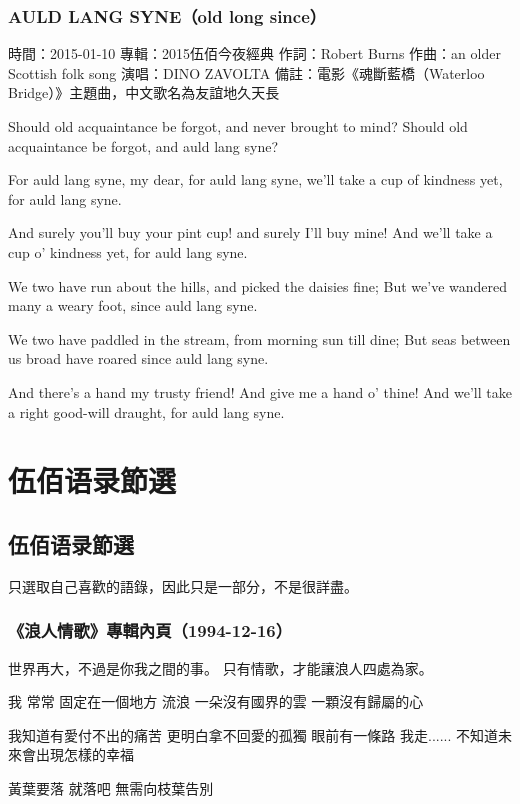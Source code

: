 \documentclass[UTF8,a4paper,oneside,twocolumn,12pt]{ctexbook}
\newcommand{\infopair}[2]{\textbullet #1：#2}
\newcommand{\zc}[1][伍佰]{\infopair{作詞}{#1}}
\newcommand{\zq}[1][伍佰]{\infopair{作曲}{#1}}
\newcommand{\zj}[1]{\infopair{專輯}{#1}}
\newcommand{\sj}[1]{\infopair{時間}{#1}}
\newcommand{\bz}[1]{\infopair{備註}{#1}}
\newenvironment{info}{\begin{flushleft}\kaishu
	}
	{\end{flushleft}\normalsize\yahei\par}
\newenvironment{lyric}{
	}
{}
\begin{document}
\section{AULD LANG SYNE（old long since）}
\begin{info}
	\sj{2015-01-10}
	\zj{2015伍佰今夜經典}
	\zc[Robert Burns]
	\zq[an older Scottish folk song]
	\infopair{演唱}{DINO ZAVOLTA}
	\bz{電影《魂斷藍橋（Waterloo Bridge）》主題曲，中文歌名為友誼地久天長}
\end{info}
\begin{lyric}
	Should old acquaintance be forgot,
	and never brought to mind?
	Should old acquaintance be forgot,
	and auld lang syne?

	For auld lang syne, my dear,
	for auld lang syne,
	we'll take a cup of kindness yet,
	for auld lang syne.

	And surely you'll buy your pint cup!
	and surely I'll buy mine!
	And we'll take a cup o' kindness yet,
	for auld lang syne.

	We two have run about the hills,
	and picked the daisies fine;
	But we've wandered many a weary foot,
	since auld lang syne.

	We two have paddled in the stream,
	from morning sun till dine;
	But seas between us broad have roared
	since auld lang syne.

	And there's a hand my trusty friend!
	And give me a hand o' thine!
	And we'll take a right good-will draught,
	for auld lang syne.
\end{lyric}

\onecolumn
\part{伍佰语录節選}
\chapter{伍佰语录節選}
只選取自己喜歡的語錄，因此只是一部分，不是很詳盡。
\section{《浪人情歌》專輯內頁（1994-12-16）}
世界再大，不過是你我之間的事。
只有情歌，才能讓浪人四處為家。

我 常常 固定在一個地方 流浪
一朵沒有國界的雲 一顆沒有歸屬的心

我知道有愛付不出的痛苦
更明白拿不回愛的孤獨
眼前有一條路 我走......
不知道未來會出現怎樣的幸福

黃葉要落 就落吧
無需向枝葉告別
\end{document}
